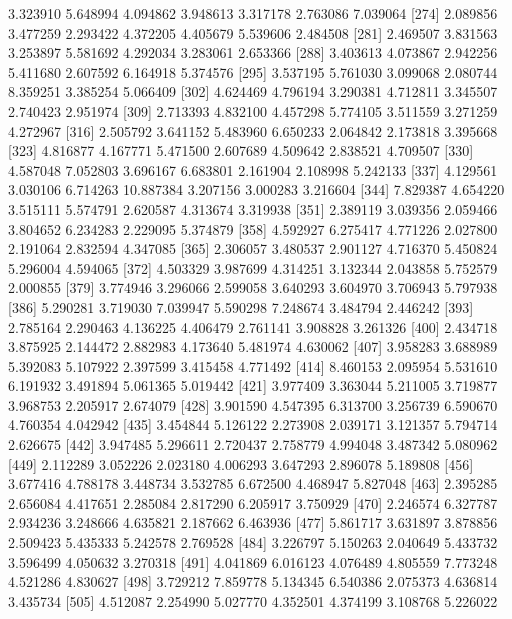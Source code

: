 \documentclass[12pt]{article}
\begin{document}
\begin{Schunk}
\begin{Soutput}
[267]  3.323910  5.648994  4.094862  3.948613  3.317178  2.763086  7.039064
[274]  2.089856  3.477259  2.293422  4.372205  4.405679  5.539606  2.484508
[281]  2.469507  3.831563  3.253897  5.581692  4.292034  3.283061  2.653366
[288]  3.403613  4.073867  2.942256  5.411680  2.607592  6.164918  5.374576
[295]  3.537195  5.761030  3.099068  2.080744  8.359251  3.385254  5.066409
[302]  4.624469  4.796194  3.290381  4.712811  3.345507  2.740423  2.951974
[309]  2.713393  4.832100  4.457298  5.774105  3.511559  3.271259  4.272967
[316]  2.505792  3.641152  5.483960  6.650233  2.064842  2.173818  3.395668
[323]  4.816877  4.167771  5.471500  2.607689  4.509642  2.838521  4.709507
[330]  4.587048  7.052803  3.696167  6.683801  2.161904  2.108998  5.242133
[337]  4.129561  3.030106  6.714263 10.887384  3.207156  3.000283  3.216604
[344]  7.829387  4.654220  3.515111  5.574791  2.620587  4.313674  3.319938
[351]  2.389119  3.039356  2.059466  3.804652  6.234283  2.229095  5.374879
[358]  4.592927  6.275417  4.771226  2.027800  2.191064  2.832594  4.347085
[365]  2.306057  3.480537  2.901127  4.716370  5.450824  5.296004  4.594065
[372]  4.503329  3.987699  4.314251  3.132344  2.043858  5.752579  2.000855
[379]  3.774946  3.296066  2.599058  3.640293  3.604970  3.706943  5.797938
[386]  5.290281  3.719030  7.039947  5.590298  7.248674  3.484794  2.446242
[393]  2.785164  2.290463  4.136225  4.406479  2.761141  3.908828  3.261326
[400]  2.434718  3.875925  2.144472  2.882983  4.173640  5.481974  4.630062
[407]  3.958283  3.688989  5.392083  5.107922  2.397599  3.415458  4.771492
[414]  8.460153  2.095954  5.531610  6.191932  3.491894  5.061365  5.019442
[421]  3.977409  3.363044  5.211005  3.719877  3.968753  2.205917  2.674079
[428]  3.901590  4.547395  6.313700  3.256739  6.590670  4.760354  4.042942
[435]  3.454844  5.126122  2.273908  2.039171  3.121357  5.794714  2.626675
[442]  3.947485  5.296611  2.720437  2.758779  4.994048  3.487342  5.080962
[449]  2.112289  3.052226  2.023180  4.006293  3.647293  2.896078  5.189808
[456]  3.677416  4.788178  3.448734  3.532785  6.672500  4.468947  5.827048
[463]  2.395285  2.656084  4.417651  2.285084  2.817290  6.205917  3.750929
[470]  2.246574  6.327787  2.934236  3.248666  4.635821  2.187662  6.463936
[477]  5.861717  3.631897  3.878856  2.509423  5.435333  5.242578  2.769528
[484]  3.226797  5.150263  2.040649  5.433732  3.596499  4.050632  3.270318
[491]  4.041869  6.016123  4.076489  4.805559  7.773248  4.521286  4.830627
[498]  3.729212  7.859778  5.134345  6.540386  2.075373  4.636814  3.435734
[505]  4.512087  2.254990  5.027770  4.352501  4.374199  3.108768  5.226022

\end{Soutput}
\end{Schunk}
\end{document}
